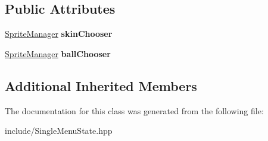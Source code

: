 \subsection*{Public Attributes}
\begin{DoxyCompactItemize}
\item 
\mbox{\label{class_single_menu_state_a9af6604efafd09a53f4305060741ea93}} 
\mbox{\hyperlink{class_sprite_manager}{Sprite\+Manager}} {\bfseries skin\+Chooser}
\item 
\mbox{\label{class_single_menu_state_acd999dc3a327d8cb340b9f46abc08397}} 
\mbox{\hyperlink{class_sprite_manager}{Sprite\+Manager}} {\bfseries ball\+Chooser}
\end{DoxyCompactItemize}
\subsection*{Additional Inherited Members}


The documentation for this class was generated from the following file\+:\begin{DoxyCompactItemize}
\item 
include/Single\+Menu\+State.\+hpp\end{DoxyCompactItemize}
